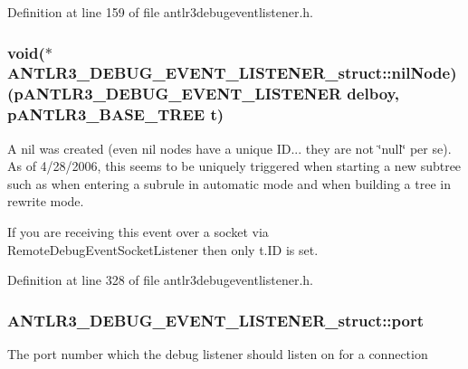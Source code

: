 Definition at line 159 of file antlr3debugeventlistener.\-h.

\hypertarget{struct_a_n_t_l_r3___d_e_b_u_g___e_v_e_n_t___l_i_s_t_e_n_e_r__struct_a2195d2af227afe0b9824781e8f5e64ae}{
\subsubsection[{nil\-Node}]{\setlength{\rightskip}{0pt plus 5cm}void($\ast$ A\-N\-T\-L\-R3\-\_\-\-D\-E\-B\-U\-G\-\_\-\-E\-V\-E\-N\-T\-\_\-\-L\-I\-S\-T\-E\-N\-E\-R\-\_\-struct\-::nil\-Node)({\bf p\-A\-N\-T\-L\-R3\-\_\-\-D\-E\-B\-U\-G\-\_\-\-E\-V\-E\-N\-T\-\_\-\-L\-I\-S\-T\-E\-N\-E\-R} delboy, {\bf p\-A\-N\-T\-L\-R3\-\_\-\-B\-A\-S\-E\-\_\-\-T\-R\-E\-E} {\bf t})}}\label{struct_a_n_t_l_r3___d_e_b_u_g___e_v_e_n_t___l_i_s_t_e_n_e_r__struct_a2195d2af227afe0b9824781e8f5e64ae}
A nil was created (even nil nodes have a unique I\-D... they are not \char`\"{}null\char`\"{} per se). As of 4/28/2006, this seems to be uniquely triggered when starting a new subtree such as when entering a subrule in automatic mode and when building a tree in rewrite mode.

If you are receiving this event over a socket via Remote\-Debug\-Event\-Socket\-Listener then only t.\-I\-D is set. 

Definition at line 328 of file antlr3debugeventlistener.\-h.

\hypertarget{struct_a_n_t_l_r3___d_e_b_u_g___e_v_e_n_t___l_i_s_t_e_n_e_r__struct_a84ad67b6e7ee2d8c5cc50a92ef51d16a}{
\subsubsection[{port}]{ A\-N\-T\-L\-R3\-\_\-\-D\-E\-B\-U\-G\-\_\-\-E\-V\-E\-N\-T\-\_\-\-L\-I\-S\-T\-E\-N\-E\-R\-\_\-struct\-::port}}\label{struct_a_n_t_l_r3___d_e_b_u_g___e_v_e_n_t___l_i_s_t_e_n_e_r__struct_a84ad67b6e7ee2d8c5cc50a92ef51d16a}
The port number which the debug listener should listen on for a connection 

